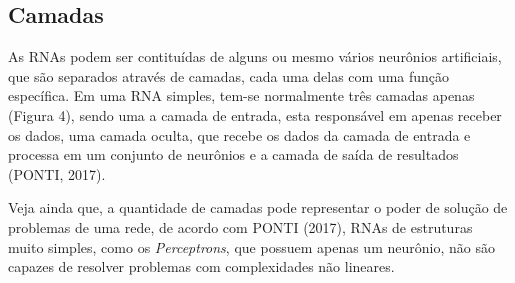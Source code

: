 \subsection{Camadas} %

As RNAs podem ser contituídas de alguns ou mesmo vários neurônios artificiais, que são separados através de camadas, cada uma delas com uma função específica. Em uma RNA simples, tem-se normalmente três camadas apenas (Figura 4), sendo uma a camada de entrada, esta responsável em apenas receber os dados, uma camada oculta, que recebe os dados da camada de entrada e processa em um conjunto de neurônios e a camada de saída de resultados (PONTI, 2017).


Veja ainda que, a quantidade de camadas pode representar o poder de solução de problemas de uma rede, de acordo com PONTI (2017), RNAs de estruturas muito simples, como os \textit{Perceptrons}, que possuem apenas um neurônio, não são capazes de resolver problemas com complexidades não lineares.




